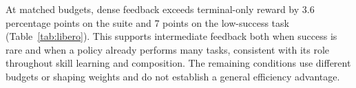 At matched budgets, dense feedback exceeds terminal-only reward by 3.6 percentage points on the suite and 7 points on the low-success task (Table~\ref{tab:libero}). This supports intermediate feedback both when success is rare and when a policy already performs many tasks, consistent with its role throughout skill learning and composition. The remaining conditions use different budgets or shaping weights and do not establish a general efficiency advantage.

